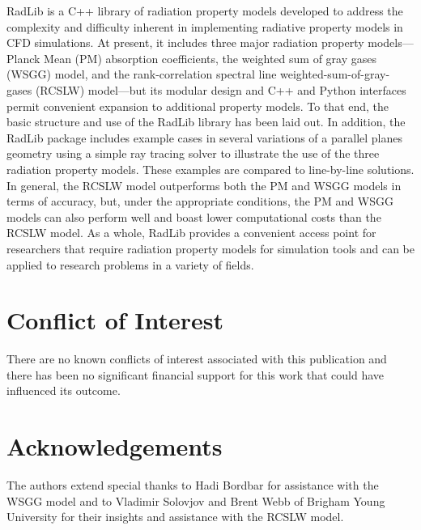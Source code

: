 \documentclass[preprint,12pt]{elsarticle}
\begin{document}
RadLib is a C++ library of radiation property models developed to address the complexity and difficulty inherent in implementing radiative property models in CFD simulations. At present, it includes three major radiation property models---Planck Mean (PM) absorption coefficients, the weighted sum of gray gases (WSGG) model, and the rank-correlation spectral line weighted-sum-of-gray-gases (RCSLW) model---but its modular design and C++ and Python interfaces permit convenient expansion to additional property models. To that end, the basic structure and use of the RadLib library has been laid out. In addition, the RadLib package includes example cases in several variations of a parallel planes geometry using a simple ray tracing solver to illustrate the use of the three radiation property models. These examples are compared to line-by-line solutions. In general, the RCSLW model outperforms both the PM and WSGG models in terms of accuracy, but, under the appropriate conditions, the PM and WSGG models can also perform well and boast lower computational costs than the RCSLW model. As a whole, RadLib provides a convenient access point for researchers that require radiation property models for simulation tools and can be applied to research problems in a variety of fields. 


\section{Conflict of Interest} \label{s:coi}

There are no known conflicts of interest associated with this publication and there has been no significant financial support for this work that could have influenced its outcome.


\section*{Acknowledgements} \label{sec:acknowledgements}

The authors extend special thanks to Hadi Bordbar for assistance with the WSGG model and to Vladimir Solovjov and Brent Webb of Brigham Young University for their insights and assistance with the RCSLW model. 


 
 

\end{document}
